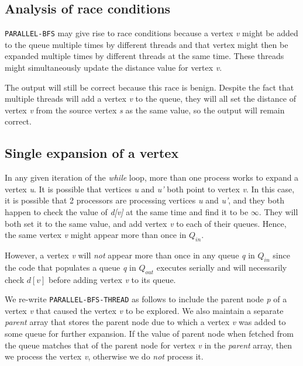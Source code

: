 \documentclass{article}
\begin{document}
\subsection{Analysis of race conditions}

\texttt{PARALLEL-BFS} may give rise to race conditions because a
vertex \textit{v} might be added to the queue multiple times by
different threads and that vertex might then be expanded multiple
times by different threads at the same time. These threads might
simultaneously update the distance value for vertex \textit{v}.

The output will still be correct because this race is benign. Despite
the fact that multiple threads will add a vertex \textit{v} to the
queue, they will all set the distance of vertex \textit{v} from the
source vertex \textit{s} as the same value, so the output will remain
correct.

\subsection{Single expansion of a vertex}

In any given iteration of the \textit{while} loop, more than one
process works to expand a vertex \textit{u}. It is possible that
vertices \textit{u} and \textit{u'} both point to vertex
\textit{v}. In this case, it is possible that 2 processors are
processing vertices \textit{u} and \textit{u'}, and they both happen
to check the value of \textit{d[v]} at the same time and find it to be
$\infty$. They will both set it to the same value, and add vertex
\textit{v} to each of their queues. Hence, the same vertex \textit{v}
might appear more than once in $Q_{in}$.

However, a vertex \textit{v} will \textit{not} appear more than once
in any queue \textit{q} in $Q_{in}$ since the code that populates a
queue \textit{q} in $Q_{out}$ executes serially and will necessarily
check $d[v]$ before adding vertex \textit{v} to its queue.

We re-write \texttt{PARALLEL-BFS-THREAD} as follows to include the
parent node \textit{p} of a vertex \textit{v} that caused the vertex
\textit{v} to be explored. We also maintain a separate \textit{parent}
array that stores the parent node due to which a vertex \textit{v} was
added to some queue for further expansion. If the value of parent node
when fetched from the queue matches that of the parent node for vertex
\textit{v} in the \textit{parent} array, then we process the vertex
\textit{v}, otherwise we do \textit{not} process it.
\end{document}
